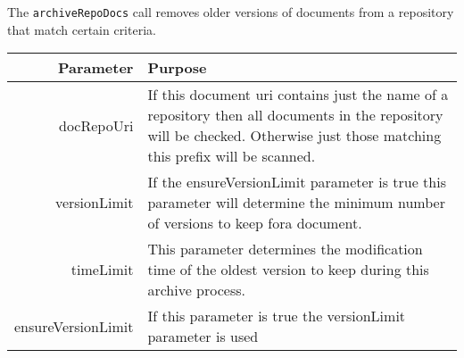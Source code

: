The \verb+archiveRepoDocs+ call removes older versions of documents from a
repository that match certain criteria.

\begin{table}[H]
  \small
\begin{center}
\begin{tabular}{r p{8cm}}
  Parameter & Purpose \\
  \hline
  docRepoUri & If this document uri contains just the name of a repository then all
  documents in the repository will be checked. Otherwise just those matching this prefix will be
  scanned. \\
  versionLimit & If the ensureVersionLimit parameter is true this parameter will determine
  the minimum number of versions to keep fora document. \\
  timeLimit & This parameter determines the modification time of the oldest version to keep during this
  archive process. \\
  ensureVersionLimit & If this parameter is true the versionLimit parameter is used \\
\end{tabular}
\end{center}
\end{table}
